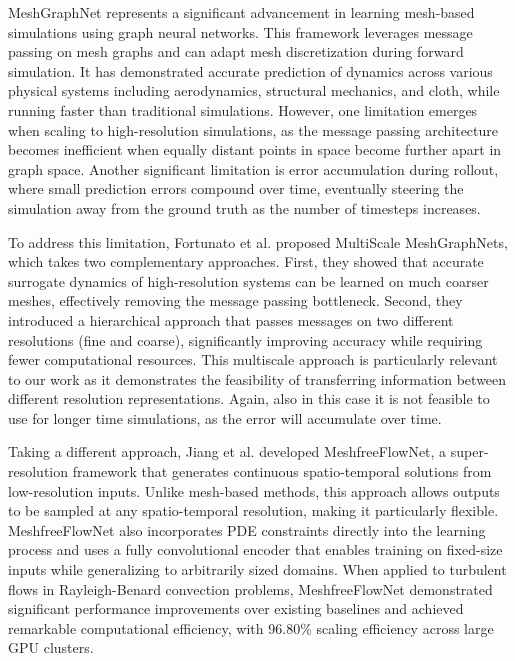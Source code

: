 MeshGraphNet \cite{pfaffLearningMeshBasedSimulation2021a} represents a significant advancement in learning mesh-based simulations using graph neural networks. This framework leverages message passing on mesh graphs and can adapt mesh discretization during forward simulation. It has demonstrated accurate prediction of dynamics across various physical systems including aerodynamics, structural mechanics, and cloth, while running faster than traditional simulations. However, one limitation emerges when scaling to high-resolution simulations, as the message passing architecture becomes inefficient when equally distant points in space become further apart in graph space. Another significant limitation is error accumulation during rollout, where small prediction errors compound over time, eventually steering the simulation away from the ground truth as the number of timesteps increases.

To address this limitation, Fortunato et al. \cite{fortunatoMultiScaleMeshGraphNets2022} proposed MultiScale MeshGraphNets, which takes two complementary approaches. First, they showed that accurate surrogate dynamics of high-resolution systems can be learned on much coarser meshes, effectively removing the message passing bottleneck. Second, they introduced a hierarchical approach that passes messages on two different resolutions (fine and coarse), significantly improving accuracy while requiring fewer computational resources. This multiscale approach is particularly relevant to our work as it demonstrates the feasibility of transferring information between different resolution representations. Again, also in this case it is not feasible to use for longer time simulations, as the error will accumulate over time.

Taking a different approach, Jiang et al. \cite{jiangMeshfreeFlowNetPhysicsConstrainedDeep2020} developed MeshfreeFlowNet, a super-resolution framework that generates continuous spatio-temporal solutions from low-resolution inputs. Unlike mesh-based methods, this approach allows outputs to be sampled at any spatio-temporal resolution, making it particularly flexible. MeshfreeFlowNet also incorporates PDE constraints directly into the learning process and uses a fully convolutional encoder that enables training on fixed-size inputs while generalizing to arbitrarily sized domains. When applied to turbulent flows in Rayleigh-Benard convection problems, MeshfreeFlowNet demonstrated significant performance improvements over existing baselines and achieved remarkable computational efficiency, with 96.80\% scaling efficiency across large GPU clusters.

